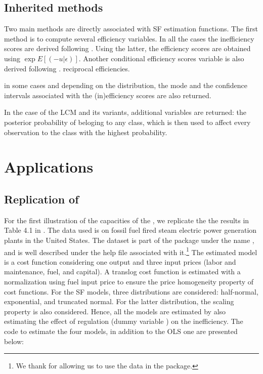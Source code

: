 \documentclass[nojss]{jss}
\begin{document}
\subsection{Inherited methods}

Two main methods are directly associated with SF estimation functions. The first
method is  to compute several efficiency variables. In all 
the cases the inefficiency scores are derived following \cite{jon82}. Using
the latter, the efficiency scores are obtained using 
$\exp{E\left[\left(-u|\epsilon\right)\right]}$. Another conditional efficiency
scores variable is also derived following \cite{batt95}. 
reciprocal efficiencies.

in some cases and depending on the distribution, the mode and the confidence
intervals associated with the (in)efficiency scores are also returned.

In the case of the LCM and its variants, additional variables are returned: 
the posterior probability of beloging to any class, which is then used to affect 
every observation to the class with the highest probability.

\section{Applications} \label{sec:illus}

\subsection[Replication of Kumbhakar et al.2014, p. 119]{Replication of~\citet[p.~119]{kum14}}

For the first illustration of the capacities of the , we replicate the 
the results in Table 4.1 in \cite[p.~119]{kum14}. The data used is on fossil fuel
fired steam electric power generation plants in the United States. The dataset
is part of the package under the name , and is well described under
the help file associated with it.\footnote{We thank \cite{kum14} for allowing
us to use the data in the package.} The estimated model is a cost function 
considering one output and three input prices (labor and maintenance, fuel, 
and capital). A translog cost function is estimated with a normalization using
fuel input price to ensure the price homogeneity property of cost functions. For
the SF models, three distributions are considered: half-normal, exponential, and
truncated normal. For the latter distribution, the scaling property is also 
considered. Hence, all the models are estimated by also estimating the effect of
regulation (dummy variable ) on the inefficiency. The code to estimate
the four models, in addition to the OLS one are presented below:
\end{document}
